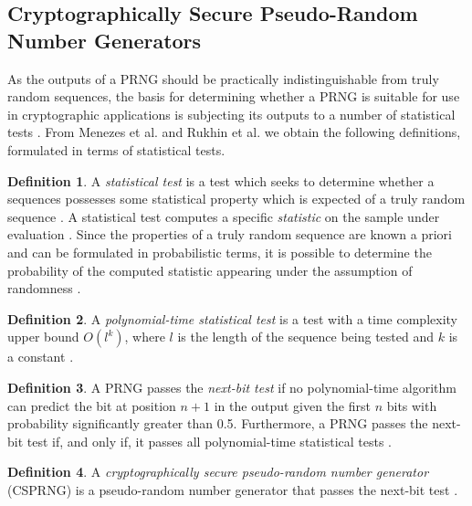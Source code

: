 \documentclass[12pt, titlepage]{report}
\theoremstyle{definition}
\newtheorem{definition}{Definition}
\begin{document}
\subsection{Cryptographically Secure Pseudo-Random Number Generators}\label{subsection:crypto_requirements}
As the outputs of a PRNG should be practically indistinguishable from truly random sequences, the basis for determining whether a PRNG is suitable for use in cryptographic applications is subjecting its outputs to a number of statistical tests \cite[p. 170]{menezes1996handbook}. From Menezes et al. and Rukhin et al. we obtain the following definitions, formulated in terms of statistical tests.

\begin{definition}
A \emph{statistical test} is a test which seeks to determine whether a sequences possesses some statistical property which is expected of a truly random sequence \cite[p. 175]{menezes1996handbook}. A statistical test computes a specific \emph{statistic} on the sample under evaluation \cite[p. 179]{menezes1996handbook}. Since the properties of a truly random sequence are known a priori and can be formulated in probabilistic terms, it is possible to determine the probability of the computed statistic appearing under the assumption of randomness \cite[s 1-3]{rukhin2001statistical}.
\end{definition}

\begin{definition}
A \emph{polynomial-time statistical test} is a test with a time complexity upper bound $O(l^k)$, where $l$ is the length of the sequence being tested and $k$ is a constant \cite[p. 171]{menezes1996handbook}.
\end{definition}

\begin{definition}
A PRNG passes the \emph{next-bit test} if no polynomial-time algorithm can predict the bit at position $n + 1$ in the output given the first $n$ bits with probability significantly greater than 0.5. Furthermore, a PRNG passes the next-bit test if, and only if, it passes all polynomial-time statistical tests \cite[p. 171]{menezes1996handbook}.
\end{definition}

\begin{definition}
A \textit{cryptographically secure pseudo-random number generator} (CSPRNG) is a pseudo-random number generator that passes the next-bit test \cite[p. 171]{menezes1996handbook}.
\end{definition}
\end{document}
